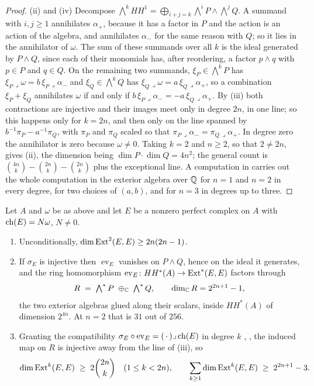 \begin{proof}
(ii) and (iv) Decompose $\bigwedge^{k}HH^{1}=\bigoplus_{i+j=k}\bigwedge^{i}P
\wedge\bigwedge^{j}Q$. A summand with $i,j\ge1$ annihilates $\alpha_{+}$,
because it has a factor in $P$ and the action is an action of the algebra, and
annihilates $\alpha_{-}$ for the same reason with $Q$; so it lies in the
annihilator of $\omega$. The sum of these summands over all $k$ is the ideal
generated by $P\wedge Q$, since each of their monomials has, after
reordering, a factor $p\wedge q$ with $p\in P$ and $q\in Q$. On the remaining
two summands, $\xi_{P}\in\bigwedge^{k}P$ has
$\xi_{P}\lrcorner\omega=b\,\xi_{P}\lrcorner\alpha_{-}$ and
$\xi_{Q}\in\bigwedge^{k}Q$ has $\xi_{Q}\lrcorner\omega=a\,\xi_{Q}\lrcorner\alpha_{+}$,
so a combination $\xi_{P}+\xi_{Q}$ annihilates $\omega$ if and only if
$b\,\xi_{P}\lrcorner\alpha_{-}=-a\,\xi_{Q}\lrcorner\alpha_{+}$. By (iii) both
contractions are injective and their images meet only in degree $2n$, in one
line; so this happens only for $k=2n$, and then only on the line spanned by
$b^{-1}\pi_{P}-a^{-1}\pi_{Q}$, with $\pi_{P}$ and $\pi_{Q}$ scaled so that
$\pi_{P}\lrcorner\alpha_{-}=\pi_{Q}\lrcorner\alpha_{+}$. In degree zero the
annihilator is zero because $\omega\ne0$. Taking $k=2$ and $n\ge2$, so that
$2\ne2n$, gives (ii), the dimension being
$\dim P\cdot\dim Q=4n^{2}$; the general count is
$\binom{4n}{k}-\binom{2n}{k}-\binom{2n}{k}$ plus the exceptional line. A computation in \cite{BMB26} carries out the whole computation in the
exterior algebra over $\mathbb{Q}$ for $n=1$ and $n=2$ in every degree, for two
choices of $(a,b)$, and for $n=3$ in degrees up to three.
\end{proof}

\begin{corollary}
\label{cor:hhfactor}
Let $A$ and $\omega$ be as above and let $E$ be a nonzero perfect complex on
$A$ with $\operatorname{ch}(E)=N\omega$, $N\ne0$.
\begin{enumerate}[label=\textup{(\roman*)},leftmargin=2.6em,itemsep=2pt]
\item Unconditionally, $\dim\operatorname{Ext}^{2}(E,E)\ge2n(2n-1)$.
\item If $\sigma_{E}$ is injective then $\operatorname{ev}_{E}$ vanishes on
  $P\wedge Q$, hence on the ideal it generates, and the ring homomorphism
  $\operatorname{ev}_{E}\colon HH^{*}(A)\to\operatorname{Ext}^{*}(E,E)$ factors through
  \[
    R\;=\;\textstyle\bigwedge^{*}P\;\oplus_{\mathbb{C}}\;\bigwedge^{*}Q,
    \qquad \dim_{\mathbb{C}}R=2^{2n+1}-1,
  \]
  the two exterior algebras glued along their scalars, inside $HH^{*}(A)$ of
  dimension $2^{4n}$. At $n=2$ that is $31$ out of $256$.
\item Granting the compatibility
  $\sigma_{E}\circ\operatorname{ev}_{E}=(\,\cdot\,)\lrcorner\operatorname{ch}(E)$ in degree
  $k$ \cite{Cal05}, \cite{CRV12}, the induced map on $R$ is injective away
  from the line of (iii), so
  \[
    \dim\operatorname{Ext}^{k}(E,E)\;\ge\;2\binom{2n}{k}\quad(1\le k<2n),
    \qquad
    \sum_{k\ge1}\dim\operatorname{Ext}^{k}(E,E)\;\ge\;2^{2n+1}-3 .
  \]
\end{enumerate}
\end{corollary}

